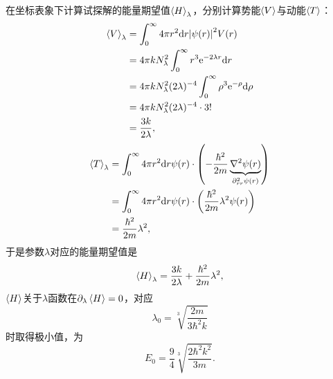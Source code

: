 \begin{tcolorbox}[breakable, title={\textbf{例题}}]
    在坐标表象下计算试探解的能量期望值$\expval{H}_\lambda$，分别计算势能$\expval{V}$与动能$\expval{T}$：
    \begin{equation}
    \begin{aligned}
        \expval{V}_\lambda
        &= \int_0^\infty 4\pi r^2 \dd r \abs{\psi(r)}^2 V(r) \\
        &= 4\pi k N_\lambda^2 \int_0^\infty r^3 \mathrm{e}^{-2\lambda r} \dd r \\
        &= 4\pi k N_\lambda^2 (2\lambda)^{-4} \int_0^\infty \rho^3 \mathrm{e}^{-\rho} \dd\rho \\
        &= 4\pi k N_\lambda^2 (2\lambda)^{-4} \cdot 3! \\
        &= \frac{3k}{2\lambda},
    \end{aligned}
    \end{equation}
    \begin{equation}
    \begin{aligned}
        \expval{T}_\lambda
        &= \int_0^\infty 4\pi r^2 \dd r \psi(r) \cdot \left(-\frac{\hbar^2}{2m}\underbrace{\nabla^2 \psi(r)}_{\partial^2_{rr}\psi(r)}\right) \\
        &= \int_0^\infty 4\pi r^2 \dd r \psi(r) \cdot \left(\frac{\hbar^2}{2m}\lambda^2 \psi(r)\right) \\
        &= \frac{\hbar^2}{2m}\lambda^2,
    \end{aligned}
    \end{equation}
    于是参数$\lambda$对应的能量期望值是
    \begin{equation}
        \expval{H}_\lambda = \frac{3k}{2\lambda} + \frac{\hbar^2}{2m}\lambda^2,
    \end{equation}
    $\expval{H}$关于$\lambda$函数在$\partial_\lambda \expval{H} = 0$，对应
    \begin{equation}
        \lambda_0 = \sqrt[3]{\frac{2m}{3\hbar^2 k}}
    \end{equation}
    时取得极小值，为
    \begin{equation}
        E_0 = \frac94\sqrt[3]{\frac{2\hbar^2 k^2}{3m}}.
    \end{equation}
\end{tcolorbox}